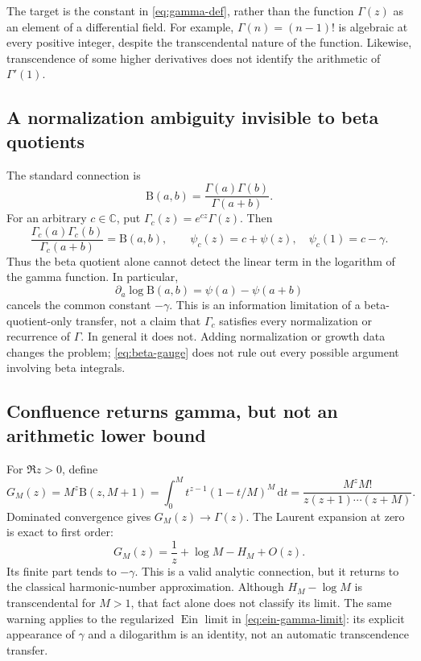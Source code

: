 \documentclass[11pt,a4paper]{article}
\numberwithin{equation}{section}
\theoremstyle{definition}
\theoremstyle{remark}
\newcommand{\C}{\mathbb C}
\newcommand{\B}{\mathrm B}
\newcommand{\Ein}{\operatorname{Ein}}
\newcommand{\dd}{\,\mathrm d}
\begin{document}
The target is the constant in \eqref{eq:gamma-def}, rather than the
function $\Gamma(z)$ as an element of a differential field. For example,
$\Gamma(n)=(n-1)!$ is algebraic at every positive integer, despite the
transcendental nature of the function. Likewise, transcendence of some
higher derivatives does not identify the arithmetic of $\Gamma'(1)$.

\subsection{A normalization ambiguity invisible to beta quotients}
The standard connection is
\begin{equation}
 \B(a,b)=\frac{\Gamma(a)\Gamma(b)}{\Gamma(a+b)}.
\end{equation}
For an arbitrary $c\in\C$, put $\Gamma_c(z)=e^{cz}\Gamma(z)$. Then
\begin{equation}\label{eq:beta-gauge}
 \frac{\Gamma_c(a)\Gamma_c(b)}{\Gamma_c(a+b)}=\B(a,b),
 \qquad \psi_c(z)=c+\psi(z),\quad\psi_c(1)=c-\gamma.
\end{equation}
Thus the beta quotient alone cannot detect the linear term in the
logarithm of the gamma function. In particular,
\[
 \partial_a\log\B(a,b)=\psi(a)-\psi(a+b)
\]
cancels the common constant $-\gamma$.
This is an information limitation of a beta-quotient-only transfer, not a
claim that $\Gamma_c$ satisfies every normalization or recurrence of
$\Gamma$. In general it does not. Adding normalization or growth data
changes the problem; \eqref{eq:beta-gauge} does not rule out every
possible argument involving beta integrals.

\subsection{Confluence returns gamma, but not an arithmetic lower bound}
For $\Re z>0$, define
\begin{equation}
 G_M(z)=M^z\B(z,M+1)
 =\int_0^M t^{z-1}(1-t/M)^M\dd t
 =\frac{M^zM!}{z(z+1)\cdots(z+M)}.
\end{equation}
Dominated convergence gives $G_M(z)\to\Gamma(z)$. The Laurent expansion
at zero is exact to first order:
\begin{equation}
 G_M(z)=\frac1z+\log M-H_M+O(z).
\end{equation}
Its finite part tends to $-\gamma$. This is a valid analytic connection,
but it returns to the classical harmonic-number approximation. Although
$H_M-\log M$ is transcendental for $M>1$, that fact alone does not classify
its limit. The same warning applies to the regularized $\Ein$ limit in
\eqref{eq:ein-gamma-limit}: its explicit appearance of $\gamma$ and a
dilogarithm is an identity, not an automatic transcendence transfer.
\end{document}
